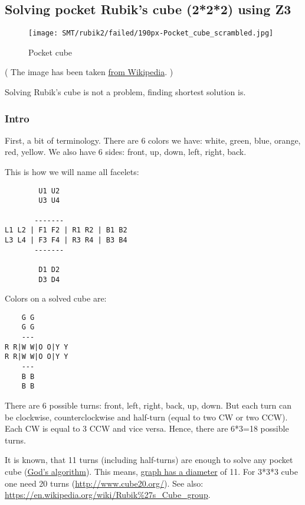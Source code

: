 \subsection{Solving pocket Rubik’s cube (2*2*2) using Z3}
\label{PocketCubeSMT}

\begin{figure}[H]
\centering
\texttt{[image: SMT/rubik2/failed/190px-Pocket\_cube\_scrambled.jpg]}
\caption{Pocket cube}
\end{figure}

( The image has been taken \href{https://en.wikipedia.org/wiki/Pocket_Cube}{from Wikipedia}. )

Solving Rubik's cube is not a problem, finding shortest solution is.

\subsubsection{Intro}

First, a bit of terminology.
There are 6 colors we have: white, green, blue, orange, red, yellow.
We also have 6 sides: front, up, down, left, right, back.

This is how we will name all facelets:

\begin{lstlisting}
        U1 U2
        U3 U4

       -------
L1 L2 | F1 F2 | R1 R2 | B1 B2
L3 L4 | F3 F4 | R3 R4 | B3 B4
       -------

        D1 D2
        D3 D4
\end{lstlisting}

Colors on a solved cube are:

\begin{lstlisting}
    G G
    G G
    ---
R R|W W|O O|Y Y
R R|W W|O O|Y Y
    ---
    B B
    B B
\end{lstlisting}

There are 6 possible turns: front, left, right, back, up, down.
But each turn can be clockwise, counterclockwise and half-turn (equal to two CW or two CCW).
Each CW is equal to 3 CCW and vice versa.
Hence, there are 6*3=18 possible turns.

It is known, that 11 turns (including half-turns) are enough to solve any pocket cube
(\href{https://en.wikipedia.org/wiki/Optimal_solutions_for_Rubik%27s_Cube}{God’s algorithm}).
This means, \href{http://mathworld.wolfram.com/GraphDiameter.html}{graph has a diameter} of 11.
For 3*3*3 cube one need 20 turns (\url{http://www.cube20.org/}).
See also: \url{https://en.wikipedia.org/wiki/Rubik%27s_Cube_group}.

